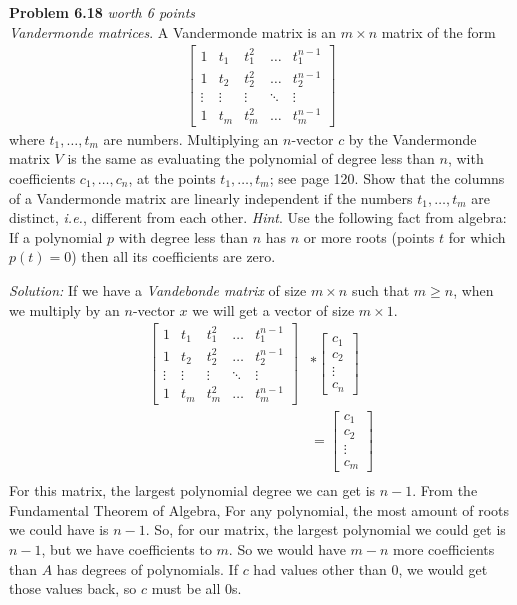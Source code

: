 \documentclass{article}
\newenvironment{problem}[3][Problem]
    { \begin{mdframed}[backgroundcolor=gray!20] \textbf{#1 #2} \textit{worth #3 points} \\}
    {  \end{mdframed}}
\newenvironment{solution}
    {\textit{Solution:}}
    {}
\begin{document}
\begin{problem}{6.18}{6}
\textit{Vandermonde matrices}. A Vandermonde matrix is an $m\times n$ matrix of the form
\begin{align*}
\begin{bmatrix}
    1 & t_{1} & t_{1}^2 & \dots  & t_{1}^{n-1} \\
    1 & t_{2} & t_{2}^2 & \dots  & t_{2}^{n-1} \\
    \vdots & \vdots & \vdots & \ddots & \vdots \\
    1 & t_{m} & t_{m}^2 & \dots  & t_{m}^{n-1} 
\end{bmatrix}
\end{align*}
where $t_1, \ldots , t_m$ are numbers. Multiplying an $n$-vector $c$ by the Vandermonde matrix $V$ is the same as evaluating the polynomial of degree less than $n$, with coefficients $c_1,\ldots , c_n$, at the points $t_1, \ldots , t_m$; see page {\color{red} 120}. Show that the columns of a Vandermonde matrix are linearly independent if the numbers $t_1, \ldots , t_m$ are distinct, \textit{i.e.}, different from each other. \textit{Hint}. Use the following fact from algebra: If a polynomial $p$ with degree less than $n$ has $n$ or more roots (points $t$ for which $p(t) = 0$) then all its coefficients are zero.
\end{problem}
\begin{solution}
If we have a \textit{Vandebonde matrix} of size $m\times n$ such that $m\geq n$, when we multiply by an $n$-vector $x$ we will get a vector of size $m\times 1$. 
\begin{align*}
    \begin{bmatrix} 1 & t_{1} & t_{1}^2 & \dots  & t_{1}^{n-1} \\
    1 & t_{2} & t_{2}^2 & \dots  & t_{2}^{n-1} \\
    \vdots & \vdots & \vdots & \ddots & \vdots \\
    1 & t_{m} & t_{m}^2 & \dots  & t_{m}^{n-1} 
    \end{bmatrix} &* \begin{bmatrix}
        c_1 \\ c_2 \\ \vdots \\ c_n
    \end{bmatrix}\\
    &= \begin{bmatrix}
        c_1 \\ c_2 \\ \vdots \\ c_m
    \end{bmatrix}\\
\end{align*}
For this matrix, the largest polynomial degree we can get is $n-1$. From the Fundamental Theorem of Algebra, For any polynomial, the most amount of roots we could have is $n-1$. So, for our matrix, the largest polynomial we could get is $n-1$, but we have coefficients to $m$. So we would have $m-n$ more coefficients than $A$ has degrees of polynomials. If $c$ had values other than 0, we would get those values back, so $c$ must be all 0s.
\end{solution}
\end{document}
